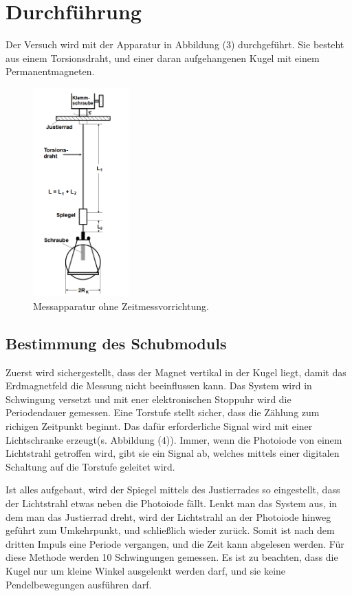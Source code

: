 \section{Durchführung}
\label{sec:Durchführung}

Der Versuch wird mit der Apparatur in Abbildung (3) durchgeführt.
Sie besteht aus einem Torsionsdraht, und einer daran aufgehangenen Kugel mit einem Permanentmagneten.

\begin{figure}[H]
 \centering
  \includegraphics[height=8cm]{Screenshot (10).png}
  \caption{Messapparatur ohne Zeitmessvorrichtung.}
  \label{fig:drill}
\end{figure}


\subsection{Bestimmung des Schubmoduls}
Zuerst wird sichergestellt, dass der Magnet vertikal in der Kugel liegt, damit das Erdmagnetfeld die Messung nicht beeinflussen kann.
Das System wird in Schwingung versetzt und mit ener elektronischen Stoppuhr wird die Periodendauer gemessen.
Eine Torstufe stellt sicher, dass die Zählung zum richigen Zeitpunkt beginnt.
Das dafür erforderliche Signal wird mit einer Lichtschranke erzeugt(s. Abbildung (4)).
Immer, wenn die Photoiode von einem Lichtstrahl getroffen wird, gibt sie ein Signal ab, welches mittels einer digitalen Schaltung auf die Torstufe geleitet wird.

Ist alles aufgebaut, wird der Spiegel mittels des Justierrades so eingestellt, dass der Lichtstrahl etwas neben die Photoiode fällt.
Lenkt man das System aus, in dem man das Justierrad dreht, wird der Lichtstrahl an der Photoiode hinweg geführt zum Umkehrpunkt, und schließlich wieder zurück.
Somit ist nach dem dritten Impuls eine Periode vergangen, und die Zeit kann abgelesen werden.
Für diese Methode werden 10 Schwingungen gemessen. Es ist zu beachten, dass die Kugel nur um kleine Winkel ausgelenkt werden darf, und sie keine Pendelbewegungen ausführen darf.


